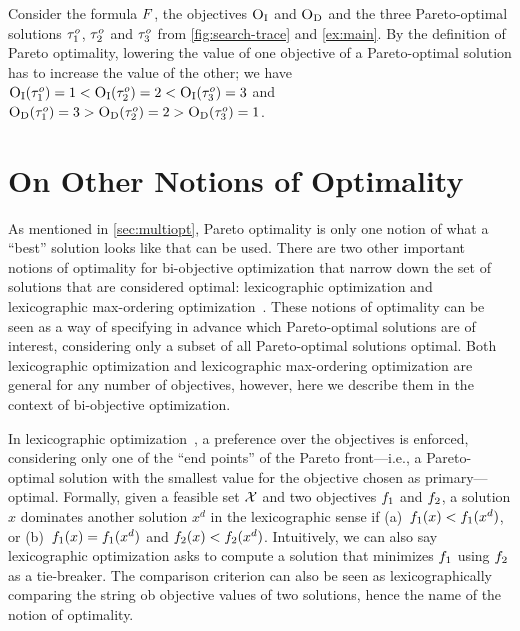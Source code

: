 \begin{example}
  Consider the formula $F$, the objectives $\textsc{O}_{\text{I}}$ and $\textsc{O}_{\text{D}}$ and the three Pareto-optimal solutions $\tau^o_1$, $\tau^o_2$ and $\tau^o_3$ from \cref{fig:search-trace} and \cref{ex:main}.
  By the definition of Pareto optimality, lowering the value of one objective of a Pareto-optimal solution has to increase the value of the other;
  we have $\textsc{O}_{\text{I}}(\tau^o_1) = 1 < \textsc{O}_{\text{I}}(\tau^o_2) = 2 < \textsc{O}_{\text{I}}(\tau^o_3) = 3$ and $\textsc{O}_{\text{D}}(\tau^o_1) = 3 > \textsc{O}_{\text{D}}(\tau^o_2) = 2 > \textsc{O}_{\text{D}}(\tau^o_3) = 1$.
\end{example}

\section{On Other Notions of Optimality}

As mentioned in \cref{sec:multiopt}, Pareto optimality is only one notion of what a ``best'' solution looks like that can be used.
There are two other important notions of optimality for bi-objective optimization that narrow down the set of solutions that are considered optimal:
lexicographic optimization and lexicographic max-ordering optimization~\autocite{Ehrgott2005-5}.
These notions of optimality can be seen as a way of specifying in advance which Pareto-optimal solutions are of interest, considering only a subset of all Pareto-optimal solutions optimal.
Both lexicographic optimization and lexicographic max-ordering optimization are general for any number of objectives, however, here we describe them in the context of bi-objective optimization.

In lexicographic optimization~\autocite{Ehrgott2005-5}, a preference over the objectives is enforced, considering only one of the ``end points'' of the Pareto front---i.e., a Pareto-optimal solution with the smallest value for the objective chosen as primary---optimal.
Formally, given a feasible set $\mathcal{X}$ and two objectives $f_1$ and $f_2$, a solution $x$ dominates another solution $x^d$ in the lexicographic sense if (a)~$f_1(x) < f_1(x^d)$, or (b)~$f_1(x) = f_1(x^d)$ and $f_2(x) < f_2(x^d)$.
Intuitively, we can also say lexicographic optimization asks to compute a solution that minimizes $f_1$ using $f_2$ as a tie-breaker.
The comparison criterion can also be seen as lexicographically comparing the string ob objective values of two solutions, hence the name of the notion of optimality.


